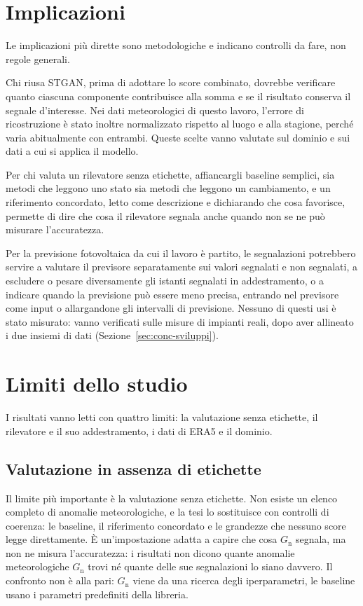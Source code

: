 \section{Implicazioni}
\label{sec:conc-implicazioni}

Le implicazioni più dirette sono metodologiche e indicano controlli da fare, non regole generali.

Chi riusa STGAN, prima di adottare lo score combinato, dovrebbe verificare quanto ciascuna componente contribuisce alla somma e se il risultato conserva il segnale d'interesse. Nei dati meteorologici di questo lavoro, l'errore di ricostruzione è stato inoltre normalizzato rispetto al luogo e alla stagione, perché varia abitualmente con entrambi. Queste scelte vanno valutate sul dominio e sui dati a cui si applica il modello.

Per chi valuta un rilevatore senza etichette, affiancargli baseline semplici, sia metodi che leggono uno stato sia metodi che leggono un cambiamento, e un riferimento concordato, letto come descrizione e dichiarando che cosa favorisce, permette di dire che cosa il rilevatore segnala anche quando non se ne può misurare l'accuratezza.

Per la previsione fotovoltaica da cui il lavoro è partito, le segnalazioni potrebbero servire a valutare il previsore separatamente sui valori segnalati e non segnalati, a escludere o pesare diversamente gli istanti segnalati in addestramento, o a indicare quando la previsione può essere meno precisa, entrando nel previsore come input o allargandone gli intervalli di previsione. Nessuno di questi usi è stato misurato: vanno verificati sulle misure di impianti reali, dopo aver allineato i due insiemi di dati (Sezione~\ref{sec:conc-sviluppi}).

\section{Limiti dello studio}
\label{sec:conc-limiti}

I risultati vanno letti con quattro limiti: la valutazione senza etichette, il rilevatore e il suo addestramento, i dati di ERA5 e il dominio.

\subsection{Valutazione in assenza di etichette}
Il limite più importante è la valutazione senza etichette. Non esiste un elenco completo di anomalie meteorologiche, e la tesi lo sostituisce con controlli di coerenza: le baseline, il riferimento concordato e le grandezze che nessuno score legge direttamente. È un'impostazione adatta a capire che cosa $G_{\mathrm{n}}$ segnala, ma non ne misura l'accuratezza: i risultati non dicono quante anomalie meteorologiche $G_{\mathrm{n}}$ trovi né quante delle sue segnalazioni lo siano davvero. Il confronto non è alla pari: $G_{\mathrm{n}}$ viene da una ricerca degli iperparametri, le baseline usano i parametri predefiniti della libreria.

